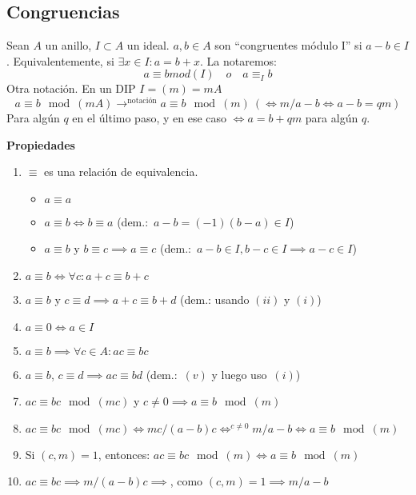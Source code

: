 \documentclass[11pt, a4paper, titlepage]{article}
\makeatletter
\renewenvironment{proof}[1][\proofname] {\vspace{-15pt}\par\pushQED{\qed}\normalfont\topsep6\p@\@plus6\p@\relax\trivlist\item[\hskip\labelsep\it#1\@addpunct{.}]\ignorespaces}{\popQED\endtrivlist\@endpefalse}
\theoremstyle{theorem-style}
\theoremstyle{definition-style}
\theoremstyle{remark-style}
\theoremstyle{example-style}
\newenvironment{nlist}
{\begin{enumerate}
\renewcommand\labelenumi{(\emph{\roman{enumi})}}}
{\end{enumerate}}
\makeatother
\begin{document}
\subsection{Congruencias}
Sean $A$ un anillo, $I \subset A$ un ideal. $a,b \in A$ son ``congruentes módulo I'' si $a-b \in I$. Equivalentemente, si $\exists x \in I : a = b+x$. La notaremos:
\[
a \equiv b mod(I) \quad o \quad a \equiv_I b
\]
Otra notación. En un DIP $I = (m) = mA$
\[
a \equiv b \mod(mA) \to^{\text{notación}} a \equiv b \mod(m)\ (\iff m/a-b \iff a-b = qm)
\]
Para algún $q$ en el último paso, y en ese caso $\iff a = b+qm$ para algún $q$.

\textbf{Propiedades}

\begin{nlist}
	\item $\equiv$ es una relación de equivalencia.
	\begin{itemize}
		\item $a \equiv a$
		\item $a \equiv b \iff b \equiv a$ (dem.:\ $a-b = (-1)(b-a) \in I$)
		\item $a \equiv b$ y $b \equiv c \implies a \equiv c$ (dem.:\ $a-b\in I, b-c \in I \implies a-c \in I$)
	\end{itemize}
	
	\item $a\equiv b \iff \forall c : a+ c \equiv b + c$
	\item $a\equiv b$ y $c \equiv d \implies a+c \equiv b + d$ (dem.: usando $(ii)$ y $(i)$)
	\item $a \equiv 0 \iff a \in I$
	\item $a \equiv b \implies \forall c\in A : ac  \equiv bc$
	\item $a \equiv b$, $c \equiv d \implies ac \equiv bd$ (dem.:\ $(v)$ y luego uso\ $(i)$)
	\item $ac \equiv bc \mod(mc) $ y $c \ne 0 \implies a\equiv b \mod(m)$\\

\begin{proof}
	$ac \equiv bc \mod(mc) \iff mc/(a-b)c \iff^{c\ne 0} m/a-b \iff a\equiv b \mod(m)$
\end{proof}
	\item Si $(c,m) = 1$, entonces: $ac\equiv bc\mod(m) \iff a \equiv b\mod(m)$\\
	\begin{proof}
	$ac\equiv bc \implies m/(a-b)c \implies$, como $(c,m) = 1 \implies m/a-b$
\end{proof}
	
	
\end{nlist}
\end{document}
